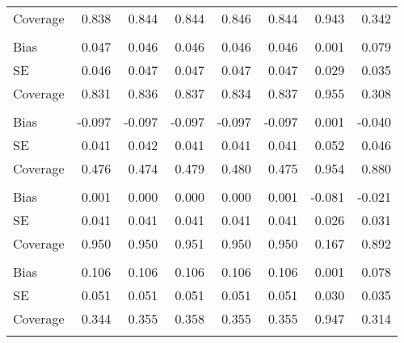 \begin{table}
\begin{tabular}[t]{lddddddd}
\hspace{1em}Coverage & 0.838 & 0.844 & 0.844 & 0.846 & 0.844 & 0.943 & 0.342\\
\addlinespace[0.3em]
\\
\hspace{1em}Bias & 0.047 & 0.046 & 0.046 & 0.046 & 0.046 & 0.001 & 0.079\\
\hspace{1em}SE & 0.046 & 0.047 & 0.047 & 0.047 & 0.047 & 0.029 & 0.035\\
\hspace{1em}Coverage & 0.831 & 0.836 & 0.837 & 0.834 & 0.837 & 0.955 & 0.308\\
\addlinespace[0.3em]
\\
\hspace{1em}Bias & -0.097 & -0.097 & -0.097 & -0.097 & -0.097 & 0.001 & -0.040\\
\hspace{1em}SE & 0.041 & 0.042 & 0.041 & 0.041 & 0.041 & 0.052 & 0.046\\
\hspace{1em}Coverage & 0.476 & 0.474 & 0.479 & 0.480 & 0.475 & 0.954 & 0.880\\
\addlinespace[0.3em]
\\
\hspace{1em}Bias & 0.001 & 0.000 & 0.000 & 0.000 & 0.001 & -0.081 & -0.021\\
\hspace{1em}SE & 0.041 & 0.041 & 0.041 & 0.041 & 0.041 & 0.026 & 0.031\\
\hspace{1em}Coverage & 0.950 & 0.950 & 0.951 & 0.950 & 0.950 & 0.167 & 0.892\\
\addlinespace[0.3em]
\\
\hspace{1em}Bias & 0.106 & 0.106 & 0.106 & 0.106 & 0.106 & 0.001 & 0.078\\
\hspace{1em}SE & 0.051 & 0.051 & 0.051 & 0.051 & 0.051 & 0.030 & 0.035\\
\hspace{1em}Coverage & 0.344 & 0.355 & 0.358 & 0.355 & 0.355 & 0.947 & 0.314\\
\addlinespace[0.3em]
\\

\end{tabular}
\end{table}
